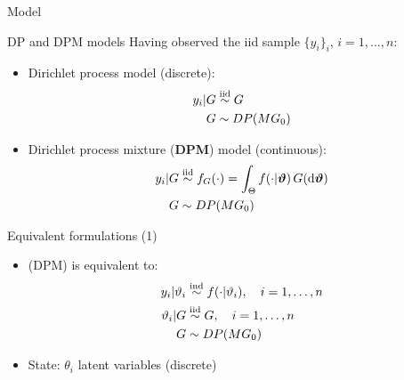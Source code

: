 
\begin{frame}[c] %
	\begin{center}
		\huge \color{blue} Model
	\end{center}
\end{frame}

\begin{frame}{DP and DPM models} %
	Having observed the iid sample $\{y_i\}_i$, $i=1,\dots,n$:
	\begin{itemize}
		\item Dirichlet process model (discrete):
		\begin{align*}
		y_i | G &\stackrel{\text{iid}}{\sim} G \\
		G &\sim DP(MG_0)
		\end{align*}
		\item Dirichlet process mixture (\textbf{DPM}) model (continuous):
		\begin{align*}
		y_i | G &\stackrel{\text{iid}}{\sim} f_G(\cdot) = \int_\Theta f(\cdot|\boldsymbol{\vartheta}) \, G(\mathrm d\boldsymbol{\vartheta}) \\
		G &\sim DP(M G_0)
		\end{align*}
	\end{itemize}
\end{frame}

\begin{frame}{Equivalent formulations (1)} %
	\begin{itemize}
		\item (DPM) is equivalent to:
		\begin{align*}
		y_i | \vartheta_i &\stackrel{\text{ind}}{\sim} f(\cdot|\vartheta_i), \quad i=1,\dots,n \\
		\vartheta_i | G &\stackrel{\text{iid}}{\sim} G, \quad i=1,\dots,n \\ 
		G &\sim DP(M G_0)
		\end{align*}
		\item State: $\theta_i$ latent variables (discrete)
	\end{itemize}
\end{frame}

